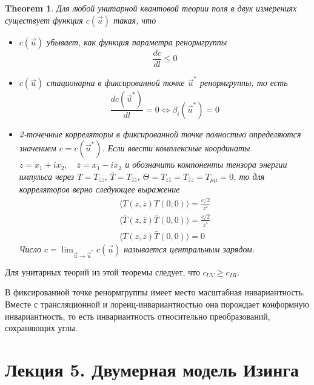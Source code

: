 \documentclass[a4paper,12pt]{article}
\newtheorem{theorem}{Theorem}
\theoremstyle{definition}
\theoremstyle{definition}
\theoremstyle{definition}
\begin{document}
\begin{theorem}
  Для любой унитарной квантовой теории поля в двух измерениях существует функция $c(\vec u)$ такая, что
  \begin{itemize}
  \item $c(\vec u)$ убывает, как функция параметра ренормгруппы
    \begin{equation}
      \label{eq:95}
      \frac{dc}{dl}\leq 0
    \end{equation}
  \item $c(\vec u)$ стационарна в фиксированной точке $\vec u^*$ ренормгруппы, то есть
    \begin{equation}
      \label{eq:96}
      \frac{dc({\vec u^*})}{dl}=0 \Leftrightarrow \beta_i(\vec u^*)=0
    \end{equation}
  \item 2-точечные корреляторы в фиксированной точке полностью определяются значением $c=c(\vec u^*)$.
    Если ввести комплексные координаты $z=x_1+ix_2,\quad \bar z=x_1-ix_2$ и обозначить компоненты тензора энергии импульса через $T=T_{zz}$, $\bar T=T_{\bar z\bar z}$, $\Theta=T_{z\bar z}=T_{\bar z z}=T_{\mu\mu}=0$, то для корреляторов верно следующее выражение
    \begin{eqnarray}
      \label{eq:97}
      \langle T(z,\bar z)T(0,0)\rangle=\frac{c/2}{z^4}\\
      \langle \bar T(z,\bar z)\bar T(0,0)\rangle=\frac{c/2}{\bar z^4}\\
      \langle T(z,\bar z) \bar T(0,0)\rangle=0
    \end{eqnarray}
    Число $c=\lim_{\vec u\to \vec u^*} c(\vec u)$ называется центральным зарядом. 
  \end{itemize}
\end{theorem}
Для унитарных теорий из этой теоремы следует, что $c_{UV}\geq c_{IR}$.

В фиксированной точке ренормгруппы имеет место масштабная инвариантность. Вместе с трансляционной и лоренц-инвариантностью она порождает конформную инвариантность, то есть инвариантность относительно преобразований, сохраняющих углы.

\section{Лекция 5. Двумерная модель Изинга}
\label{sec:lecture-5}
\end{document}
